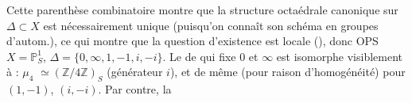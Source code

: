 \documentclass[11pt,a4paper]{article}
\begin{document}
Cette parenthèse combinatoire montre que la structure octaédrale canonique sur
$\Delta \subset X$ est nécessairement unique (puisqu'on connaît son schéma en
groupes d'autom.), ce qui montre que la question d'existence est locale
(), donc OPS $X = \mathbb{P}^1_S$,
$\Delta = \{0, \infty, 1, -1, i, -i\}$. Le 
 de  \struck{$\Gamma$} qui fixe $0$ et
$\infty$ est isomorphe visiblement à : $\mu_4$ \struck{\ill{}}
$\simeq (\mathbb{Z}/4\mathbb{Z})_S$ (générateur $i$),  et de même
(pour raison d'homogénéité) pour $(1, -1)$, $(i, -i)$. Par contre, la
\end{document}
